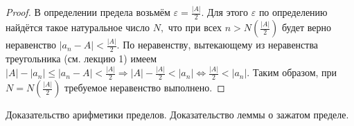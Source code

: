 \begin{proof}
    В определении предела
    возьмём $\varepsilon=\frac{|A|}{2}$.
    Для этого $\varepsilon$ по определению
    найдётся такое натуральное число
    $N,$ что при всех
    $n>N\left(\frac{|A|}{2}\right)$ будет
    верно неравенство $|a_n-A|<
        \frac{|A|}{2}.$ По неравенству,
    вытекающему из неравенства треугольника
    (см. лекцию 1) имеем
    $|A|-|a_n|\leq|a_n-A|<\frac{|A|}{2}\Rightarrow
        |A|-\frac{|A|}{2}<|a_n|\Leftrightarrow
        \frac{|A|}{2}<|a_n|.$
    Таким образом, при $N=N\left(\frac{|A|}
        {2}\right)$
    требуемое неравенство выполнено.
\end{proof}

\newpage
\begin{problem}
Доказательство арифметики пределов. Доказательство леммы о зажатом пределе.
\end{problem}

